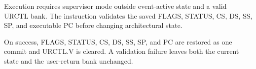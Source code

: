 Execution requires supervisor mode outside event-active state and a valid URCTL bank. The instruction validates the saved FLAGS, STATUS, CS, DS, SS, SP, and executable PC before changing architectural state.

On success, FLAGS, STATUS, CS, DS, SS, SP, and PC are restored as one commit and URCTL.V is cleared. A validation failure leaves both the current state and the user-return bank unchanged.
